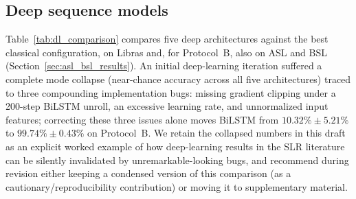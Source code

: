 \documentclass[journal]{IEEEtran}
\begin{document}
\subsection{Deep sequence models}
\label{ssec:dl_comparison}
Table~\ref{tab:dl_comparison} compares five deep architectures against the best classical configuration, on Libras and, for Protocol~B, also on ASL and BSL (Section~\ref{sec:asl_bsl_results}). An initial deep-learning iteration suffered a complete mode collapse (near-chance accuracy across all five architectures) traced to three compounding implementation bugs: missing gradient clipping under a 200-step BiLSTM unroll, an excessive learning rate, and unnormalized input features; correcting these three issues alone moves BiLSTM from $10.32\%\pm5.21\%$ to $99.74\%\pm0.43\%$ on Protocol~B. We retain the collapsed numbers in this draft as an explicit worked example of how deep-learning results in the SLR literature can be silently invalidated by unremarkable-looking bugs, and recommend during revision either keeping a condensed version of this comparison (as a cautionary/reproducibility contribution) or moving it to supplementary material.
\end{document}
